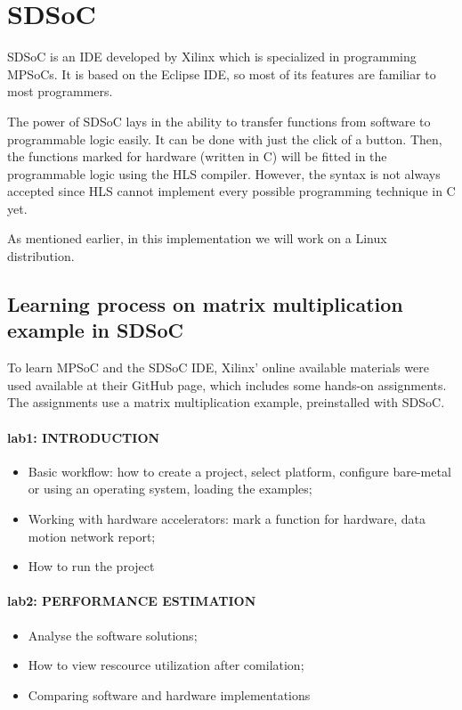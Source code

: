 \section{SDSoC}

SDSoC is an IDE developed by Xilinx which is specialized in programming MPSoCs. It is based on the Eclipse IDE, so most of its features are familiar to most programmers. 

The power of SDSoC lays in the ability to transfer functions from software to programmable logic easily. It can be done with just the click of a button. Then, the functions marked for hardware (written in C) will be fitted in the programmable logic using the HLS compiler. However, the syntax is not always accepted since HLS cannot implement every possible programming technique in C yet.

As mentioned earlier, in this implementation we will work on a Linux distribution.

\subsection{Learning process on matrix multiplication example in SDSoC}

To learn MPSoC and the SDSoC IDE, Xilinx' online available materials were used available at their GitHub page, which includes some hands-on assignments. The assignments use a matrix multiplication example, preinstalled with SDSoC.

\paragraph{lab1: INTRODUCTION}
\begin{itemize}
	\item Basic workflow: how to create a project, select platform, configure bare-metal or using an operating system, loading the examples;
	\item Working with hardware accelerators: mark a function for hardware, data motion network report;
	\item How to run the project
\end{itemize}

\paragraph{lab2: PERFORMANCE ESTIMATION} 
\begin{itemize}
	\item Analyse the software solutions;
	\item How to view rescource utilization after comilation; 
	\item Comparing software and hardware implementations
\end{itemize}


